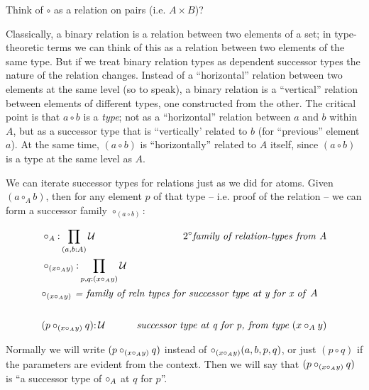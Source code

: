 \documentclass{article}
\begin{document}
\begin{remark}
  Think of \(\circ\) as a relation on pairs (i.e. \(A\times B\))?
\end{remark}

Classically, a binary relation is a relation between two elements of a
set; in type-theoretic terms we can think of this as a relation
between two elements of the same type.  But if we treat binary
relation types as dependent successor types the nature of the relation
changes.  Instead of a ``horizontal'' relation between two elements at
the same level (so to speak), a binary relation is a ``vertical''
relation between elements of different types, one constructed from the
other.  The critical point is that \(a\circ b\) is a \emph{type}; not
as a ``horizontal'' relation between \(a\) and \(b\) within \(A\), but
as a successor type that is ``vertically' related to \(b\) (for
``previous'' element \(a\)).  At the same time, \((a\circ b)\) is
``horizontally'' related to \(A\) itself, since \((a\circ b)\) is a type at
the same level as \(A\).

We can iterate successor types for relations just as we did for atoms.
Given \((a\circ_A b)\), then for any element \(p\) of that type --
i.e. proof of the relation -- we can form a successor family \(\circ_{(a\circ b)}\):


\begin{align}
  & \relAdef &  2^{\circ}\textit{family of relation-types from A} \\
  & \relrelAdef & \\
\intertext{\hfill\(\relrelA\) \textit{= family of reln types for successor type at y for x of}\ \(A\)} \\
  & (p\relrelA q){:}\,\Univ & \textit{successor type at q for p, from type}\ (x\circ_A y)
\end{align}

Normally we will write \((p\circ_{(x\circ_Ay)} q)\) instead of
\(\circ_{(x\circ_Ay)}(a,b,p,q)\), or just \((p\circ q)\) if the parameters are
evident from the context.  Then we will say that \((p\circ_{(x\circ_Ay)} q)\) is
``a successor type of \(\circ_A\) at \(q\) for \(p\)''.
\end{document}
